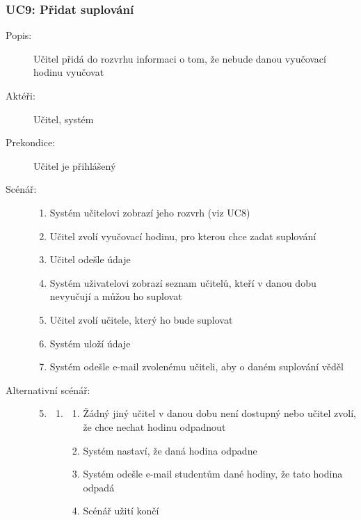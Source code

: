 \documentclass[a4paper,10pt,titlepage]{article}
\begin{document}
	\subsubsection*{UC9: Přidat suplování}
	\begin{description}
		\item[Popis:] Učitel přidá do rozvrhu informaci o tom, že nebude danou vyučovací hodinu vyučovat
		\item[Aktéři:] Učitel, systém
		\item[Prekondice:] Učitel je přihlášený
		\item[Scénář:] \hfill
				\begin{enumerate}
					\item Systém učitelovi zobrazí jeho rozvrh (viz UC8)
					\item Učitel zvolí vyučovací hodinu, pro kterou chce zadat suplování
					\item Učitel odešle údaje
					\item Systém uživatelovi zobrazí seznam učitelů, kteří v danou dobu nevyučují a můžou ho suplovat
					\item Učitel zvolí učitele, který ho bude suplovat
					\item Systém uloží údaje
					\item Systém odešle e-mail zvolenému učiteli, aby o daném suplování věděl
				\end{enumerate}
		\item[Alternativní scénář:] \hfill
				\begin{enumerate}
					\setcounter{enumi}{4}
					\setcounter{enumii}{1}
					\item \begin{enumerate}[label*=\arabic*.,leftmargin=8pt]
						\item
							\begin{enumerate}[label=\alph*.]
								\item Žádný jiný učitel v danou dobu není dostupný nebo učitel zvolí, že chce nechat hodinu odpadnout
								\item Systém nastaví, že daná hodina odpadne
								\item Systém odešle e-mail studentům dané hodiny, že tato hodina odpadá
								\item Scénář užití končí
							\end{enumerate}
					\end{enumerate}		
				\end{enumerate}
	\end{description}
\end{document}
